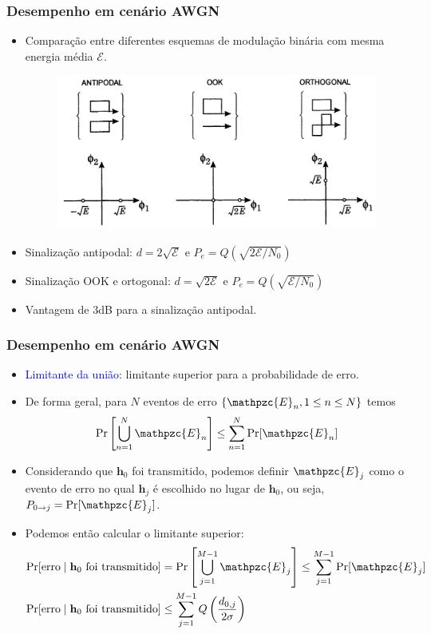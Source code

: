 \begin{frame}
	\frametitle{Desempenho em cenário AWGN}

	\begin{itemize}
	    \item Comparação entre diferentes esquemas de modulação binária com mesma energia média $\mathcal{E}$.
	    \begin{figure}[t]	
	      \begin{center}
		\includegraphics[width=0.65\columnwidth]{figs/adv_05}
	      \end{center}
	    \end{figure}
	    \item Sinalização antipodal: $d=2\sqrt{\mathcal{E}}$ e $P_e = Q(\sqrt{2\mathcal{E}/N_0})$
	    \item Sinalização OOK e ortogonal: $d=\sqrt{2\mathcal{E}}$ e $P_e = Q(\sqrt{\mathcal{E}/N_0})$
	    \item Vantagem de 3dB para a sinalização antipodal.
	\end{itemize}
\end{frame}

\begin{frame}
	\frametitle{Desempenho em cenário AWGN}

	\begin{itemize}
	    \item \textcolor{blue}{Limitante da união}: limitante superior para a probabilidade de erro.
	    \item De forma geral, para $N$ eventos de erro $\{ \mathpzc{E}_n, 1 \leq n \leq N \}$ temos
	    \begin{equation*}
		\mathrm{Pr}\left[ \bigcup_{n=1}^N \mathpzc{E}_n \right] \leq \sum_{n=1}^N \mathrm{Pr}[\mathpzc{E}_n] 
	    \end{equation*}
	    \item Considerando que $\mathbf{h}_0$ foi transmitido, podemos definir $\mathpzc{E}_j$ como o evento de erro no qual $\mathbf{h}_j$ é escolhido no lugar de $\mathbf{h}_0$, ou seja, $P_{0\rightarrow j} = \mathrm{Pr}[\mathpzc{E}_j]$.
	    \item Podemos então calcular o limitante superior:
	    \begin{align*}
		\mathrm{Pr}[\text{erro} \mid \mathbf{h}_0 \text{ foi transmitido}] &=  \mathrm{Pr}\left[ \bigcup_{j=1}^{M-1} \mathpzc{E}_j \right] \leq \sum_{j=1}^{M-1} \mathrm{Pr}[\mathpzc{E}_j] \\
		\mathrm{Pr}[\text{erro} \mid \mathbf{h}_0 \text{ foi transmitido}] &\leq \sum_{j=1}^{M-1} Q\left(\frac{d_{0,j}}{2\sigma} \right)
	    \end{align*}	    
	\end{itemize}
\end{frame}

